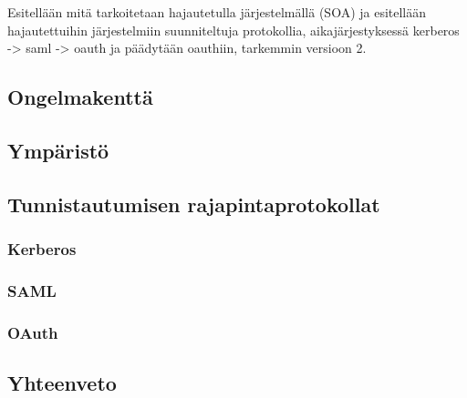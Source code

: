 Esitellään mitä tarkoitetaan hajautetulla järjestelmällä (SOA) ja esitellään hajautettuihin järjestelmiin suunniteltuja protokollia, aikajärjestyksessä  kerberos -> saml -> oauth ja päädytään oauthiin, tarkemmin versioon 2.


\subsection{Ongelmakenttä}

\subsection{Ympäristö}

\subsection{Tunnistautumisen rajapintaprotokollat}

\subsubsection{Kerberos}

\subsubsection{SAML}

\subsubsection{OAuth}

\subsection{Yhteenveto}
